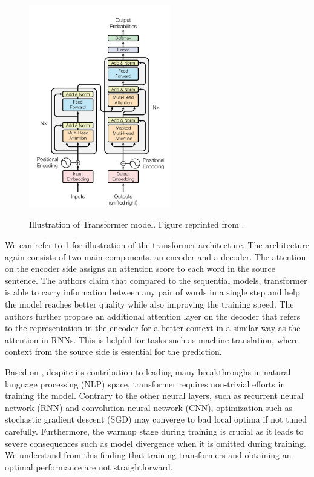 \begin{figure}[t]
    {\includegraphics[width=0.55\textwidth]{img/transformer.png}}
    \centering
    \caption{Illustration of Transformer model. Figure reprinted from .}
    \label{img:transformer}
\end{figure}

We can refer to \cref{img:transformer} for illustration of the transformer architecture. The architecture again consists of two main components, an encoder and a decoder. The attention on the encoder side assigns an attention score to each word in the source sentence. The authors claim that compared to the sequential models, transformer is able to carry information between any pair of words in a single step and help the model reaches better quality while also improving the training speed. The authors further propose an additional attention layer on the decoder that refers to the representation in the encoder for a better context in a similar way as the attention in RNNs. This is helpful for tasks such as machine translation, where context from the source side is essential for the prediction.

Based on , despite its contribution to leading many breakthroughs in natural language processing (NLP) space, transformer requires non-trivial efforts in training the model. Contrary to the other neural layers, such as recurrent neural network (RNN) and convolution neural network (CNN), optimization such as stochastic gradient descent (SGD) may converge to bad local optima if not tuned carefully. Furthermore, the warmup stage during training is crucial as it leads to severe consequences such as model divergence when it is omitted during training. We understand from this finding that training transformers and obtaining an optimal performance are not straightforward.

